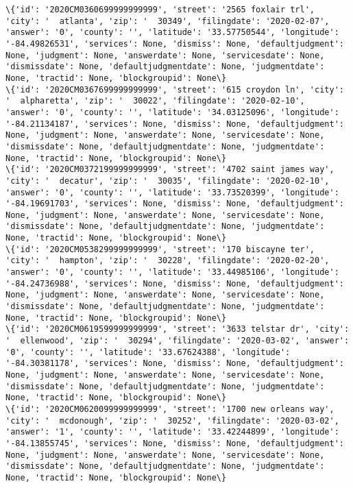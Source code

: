 \documentclass[11pt]{article}
\begin{document}
\begin{Verbatim}[commandchars=\\\{\}]
\{'id': '2020CM0360699999999999', 'street': '2565 foxlair trl', 'city': '  atlanta', 'zip': '  30349', 'filingdate': '2020-02-07', 'answer': '0', 'county': '', 'latitude': '33.57750544', 'longitude': '-84.49826531', 'services': None, 'dismiss': None, 'defaultjudgment': None, 'judgment': None, 'answerdate': None, 'servicesdate': None, 'dismissdate': None, 'defaultjudgmentdate': None, 'judgmentdate': None, 'tractid': None, 'blockgroupid': None\}
\{'id': '2020CM0367699999999999', 'street': '615 croydon ln', 'city': '  alpharetta', 'zip': '  30022', 'filingdate': '2020-02-10', 'answer': '0', 'county': '', 'latitude': '34.03125096', 'longitude': '-84.21134187', 'services': None, 'dismiss': None, 'defaultjudgment': None, 'judgment': None, 'answerdate': None, 'servicesdate': None, 'dismissdate': None, 'defaultjudgmentdate': None, 'judgmentdate': None, 'tractid': None, 'blockgroupid': None\}
\{'id': '2020CM0372199999999999', 'street': '4702 saint james way', 'city': '  decatur', 'zip': '  30035', 'filingdate': '2020-02-10', 'answer': '0', 'county': '', 'latitude': '33.73520399', 'longitude': '-84.19691703', 'services': None, 'dismiss': None, 'defaultjudgment': None, 'judgment': None, 'answerdate': None, 'servicesdate': None, 'dismissdate': None, 'defaultjudgmentdate': None, 'judgmentdate': None, 'tractid': None, 'blockgroupid': None\}
\{'id': '2020CM0538299999999999', 'street': '170 biscayne ter', 'city': '  hampton', 'zip': '  30228', 'filingdate': '2020-02-20', 'answer': '0', 'county': '', 'latitude': '33.44985106', 'longitude': '-84.24736988', 'services': None, 'dismiss': None, 'defaultjudgment': None, 'judgment': None, 'answerdate': None, 'servicesdate': None, 'dismissdate': None, 'defaultjudgmentdate': None, 'judgmentdate': None, 'tractid': None, 'blockgroupid': None\}
\{'id': '2020CM0619599999999999', 'street': '3633 telstar dr', 'city': '  ellenwood', 'zip': '  30294', 'filingdate': '2020-03-02', 'answer': '0', 'county': '', 'latitude': '33.67624388', 'longitude': '-84.30381178', 'services': None, 'dismiss': None, 'defaultjudgment': None, 'judgment': None, 'answerdate': None, 'servicesdate': None, 'dismissdate': None, 'defaultjudgmentdate': None, 'judgmentdate': None, 'tractid': None, 'blockgroupid': None\}
\{'id': '2020CM0620099999999999', 'street': '1700 new orleans way', 'city': '  mcdonough', 'zip': '  30252', 'filingdate': '2020-03-02', 'answer': '1', 'county': '', 'latitude': '33.42244899', 'longitude': '-84.13855745', 'services': None, 'dismiss': None, 'defaultjudgment': None, 'judgment': None, 'answerdate': None, 'servicesdate': None, 'dismissdate': None, 'defaultjudgmentdate': None, 'judgmentdate': None, 'tractid': None, 'blockgroupid': None\}

\end{Verbatim}
\end{document}
